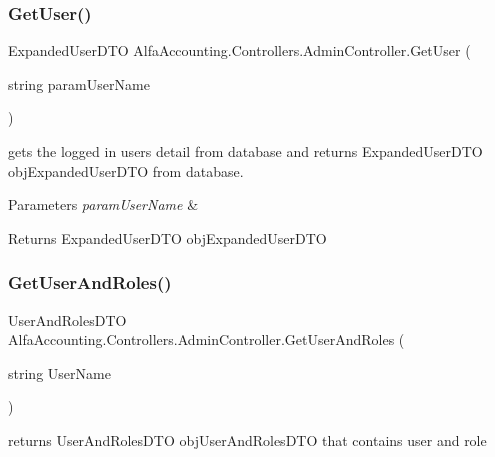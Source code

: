 \subsubsection{\texorpdfstring{Get\+User()}{GetUser()}}
{\footnotesize\ttfamily Expanded\+User\+D\+TO Alfa\+Accounting.\+Controllers.\+Admin\+Controller.\+Get\+User (\begin{DoxyParamCaption}\item[{string}]{param\+User\+Name }\end{DoxyParamCaption})\hspace{0.3cm}{\ttfamily [private]}}



gets the logged in user\textquotesingle{}s detail from database and returns Expanded\+User\+D\+TO obj\+Expanded\+User\+D\+TO from database. 


\begin{DoxyParams}{Parameters}
{\em param\+User\+Name} & \\
\hline
\end{DoxyParams}
\begin{DoxyReturn}{Returns}
Expanded\+User\+D\+TO obj\+Expanded\+User\+D\+TO
\end{DoxyReturn}
\mbox{\label{class_alfa_accounting_1_1_controllers_1_1_admin_controller_a29957ccd465eb001f6964bce6ddbcfff}} 
\subsubsection{\texorpdfstring{Get\+User\+And\+Roles()}{GetUserAndRoles()}}
{\footnotesize\ttfamily User\+And\+Roles\+D\+TO Alfa\+Accounting.\+Controllers.\+Admin\+Controller.\+Get\+User\+And\+Roles (\begin{DoxyParamCaption}\item[{string}]{User\+Name }\end{DoxyParamCaption})\hspace{0.3cm}{\ttfamily [private]}}



returns User\+And\+Roles\+D\+TO obj\+User\+And\+Roles\+D\+TO that contains user and role 


